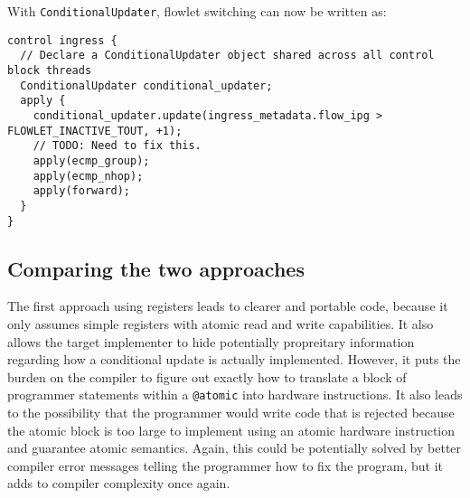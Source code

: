 With \texttt{ConditionalUpdater}, flowlet switching can now be written as:

\begin{verbatim}
control ingress {
  // Declare a ConditionalUpdater object shared across all control block threads
  ConditionalUpdater conditional_updater;
  apply {
    conditional_updater.update(ingress_metadata.flow_ipg > FLOWLET_INACTIVE_TOUT, +1);
    // TODO: Need to fix this.
    apply(ecmp_group);
    apply(ecmp_nhop);
    apply(forward);
  }
}
\end{verbatim}

\subsection{Comparing the two approaches}
The first approach using registers leads to clearer and portable code, because
it only assumes simple registers with atomic read and write capabilities. It
also allows the target implementer to hide potentially propreitary information
regarding how a conditional update is actually implemented. However, it puts
the burden on the compiler to figure out exactly how to translate a block of
programmer statements within a \texttt{@atomic} into hardware instructions. It
also leads to the possibility that the programmer would write code that is
rejected because the atomic block is too large to implement using an atomic
hardware instruction and guarantee atomic semantics. Again, this could be
potentially solved by better compiler error messages telling the programmer how
to fix the program, but it adds to compiler complexity once again.

